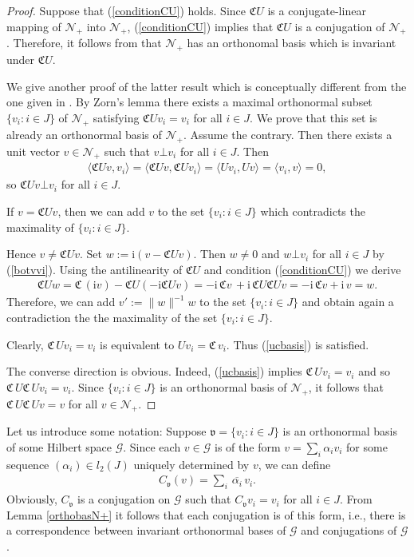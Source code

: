 \documentclass[12pt]{amsart}
\newcommand{\ii}{\mathrm{i}}
\theoremstyle{definition}
\newcommand{\ov}{\overline}
\newcommand{\cN}{\mathcal{N}}
\newcommand{\cG}{\mathcal{G}}
\newcommand{\gC}{\mathfrak{C}}
\newcommand{\gv}{\mathfrak{v}}
\begin{document}
\begin{proof}
Suppose that (\ref{conditionCU}) holds. Since $\gC U$ is a conjugate-linear mapping of $\cN_+$ into $\cN_+$,  (\ref{conditionCU}) implies that $\gC U$ is a conjugation of $\cN_+$.
Therefore, it follows from \cite[Lemma 1]{gp1} that $\cN_+$ has an orthonomal basis which is invariant under $\gC U$.

We give another proof of the latter result which is conceptually different from the one given in \cite{gp1}.
By Zorn's lemma there exists a maximal orthonormal subset $\{v_i:i\in J\}$ of $\cN_+$ satisfying $\gC Uv_i=v_i$ for all $i\in J$. We prove that this set is already an orthonormal basis of $\cN_+$. Assume  the contrary. Then  there exists a unit vector $v\in \cN_+$ such that $v\bot v_i$ for all $i\in J$. Then
\begin{align}\label{botvvi}
\langle \gC Uv,v_i\rangle =\langle \gC Uv,\gC Uv_i\rangle =\langle Uv_i,Uv\rangle =\langle v_i,v\rangle =0,
\end{align}
so $\gC Uv\bot v_i$ for all $i\in J$.

If $v=\gC Uv$, then we can  add $v$ to the set $\{v_i:i\in J\}$ which  contradicts  the maximality of $\{v_i:i\in J\}$.

Hence   $v\neq \gC U v$. Set $w:=\ii (v-\gC Uv )$. Then $w\neq 0$ and $w\bot v_i$ for all $i\in J$ by (\ref{botvvi}). Using the antilinearity of $\gC U$ and condition (\ref{conditionCU})  we derive
\begin{align*}
\gC U w=\gC \,(\ii v) -\gC U (- \ii \gC Uv)=-\ii\, \gC v\, +\ii \,\gC U\gC U v=-\ii\, \gC v+\ii\, v=w.
\end{align*}
Therefore, we can add $v':=\|w\|^{-1} w$ to the set $\{v_i:i\in J\}$ and obtain again a contradiction the the maximality of the set $\{v_i:i\in J\}$.

Clearly, $\gC\, Uv_i=v_i$ is equivalent to $Uv_i =\gC\, v_i$. Thus (\ref{ucbasis}) is satisfied.

The converse direction is  obvious. Indeed, (\ref{ucbasis}) implies $\gC\, U v_i=v_i$ and so $\gC\, U\gC\, Uv_i=v_i$. Since $\{v_i:i\in J\}$ is an orthonormal basis of $\cN_+$, it follows that  $\gC\, U\gC\, Uv=v$ for all $v\in \cN_+$.
\end{proof}



Let us  introduce some notation:
Suppose  $\gv=\{v_i:i\in J\}$ is an orthonormal basis of some Hilbert space $\cG$. Since each $v\in \cG$ is of the form $v=\sum_i \alpha_i v_i$ for some sequence $(\alpha_i)\in l_2(J)$  uniquely determined by $v$,  we  can define
\begin{align*}
C_\gv (v)=\sum\nolimits_i \, \ov{\alpha_i}\, v_i.
\end{align*}
Obviously,  $C_\gv$ is a conjugation on $\cG$ such that $C_\gv v_i=v_i$ for all $i\in J$. From Lemma \ref{orthobasN+} it follows that  each conjugation is of
this form, i.e., there is a  correspondence between  invariant orthonormal bases of $\cG$ and  conjugations of $\cG$.
\end{document}
